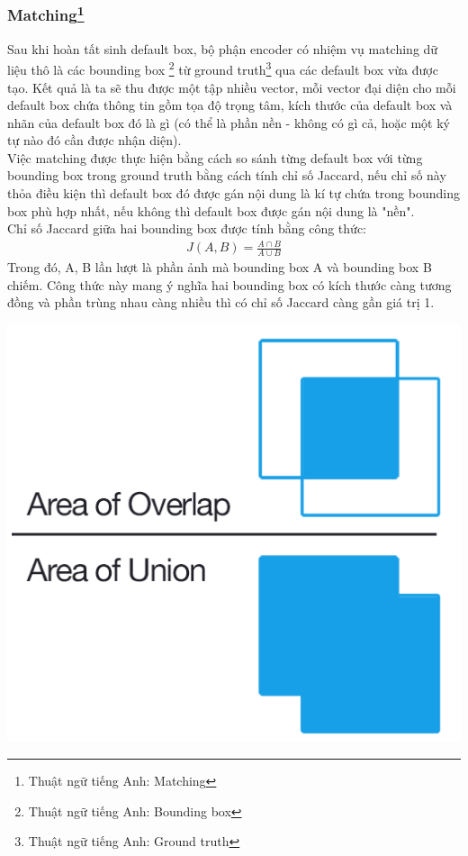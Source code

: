 \documentclass[a4paper,12pt]{article}
\begin{document}
	\subsubsection*{Matching\footnote{Thuật ngữ tiếng Anh: Matching}}
	
	Sau khi hoàn tất sinh default box, bộ phận encoder có nhiệm vụ matching dữ liệu thô là các bounding box \footnote{Thuật ngữ tiếng Anh: Bounding box} từ ground truth\footnote{Thuật ngữ tiếng Anh: Ground truth} qua các default box vừa được tạo. Kết quả là ta sẽ thu được một tập nhiều vector, mỗi vector đại diện cho mỗi default box chứa thông tin gồm tọa độ trọng tâm, kích thước của default box và nhãn của default box đó là gì (có thể là phần nền - không có gì cả, hoặc một ký tự nào đó cần được nhận diện). \\
	
	Việc matching được thực hiện bằng cách so sánh từng default box với từng bounding box trong ground truth bằng cách tính chỉ số Jaccard\cite{Jaccard}, nếu chỉ số này thỏa điều kiện thì default box đó được gán nội dung là kí tự chứa trong bounding box phù hợp nhất, nếu không thì default box được gán nội dung là "nền".\\
	
	Chỉ số Jaccard\cite{Jaccard} giữa hai bounding box được tính bằng công thức:
	\begin{align}
	J(A, B) = \frac{A \cap B }{ A \cup B }
	\end{align}
	Trong đó, A, B lần lượt là phần ảnh mà bounding box A và bounding box B chiếm. Công thức này mang ý nghĩa hai bounding box có kích thước càng tương đồng và phần trùng nhau càng nhiều thì có chỉ số Jaccard\cite{Jaccard} càng gần giá trị 1.\\
	
	\begin{center}
		\centering
		\includegraphics[width=0.5\linewidth]{Intersection_over_Union_-_visual_equation.png}
		\vspace{0.5cm}
	\end{center}
	
\end{document}
